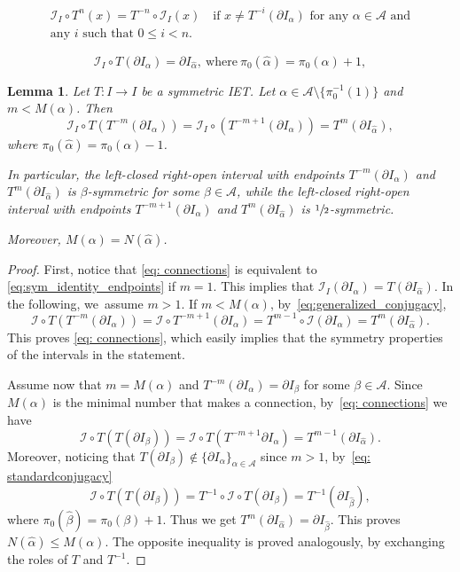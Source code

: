 \documentclass[10pt,a4paper]{article}
\theoremstyle{plain}
\newtheorem{lemma}[theorem]{Lemma}
\theoremstyle{definition}
\newcommand{\A}{\mathcal{A}}
\newcommand{\I}{\mathcal{I}}
\begin{document}
\begin{multline}
\label{eq:generalized_conjugacy}
\mathcal{I}_I\circ T^n(x)=T^{-n}\circ\mathcal{I}_I(x) \quad \text{if } x \neq T^{-i}(\partial I_\alpha) \text{ for any } \alpha \in \A \text{ and}\\ \text{any $i$ such that } 0 \leq i < n.
\end{multline}

\begin{equation}
\label{eq:sym_identity_endpoints}
\I_I\circ T(\partial I_{\alpha})=\partial I_{\hat\alpha},\ \text{where}\ \pi_0(\hat\alpha)=\pi_0(\alpha)+1,
\end{equation}

\begin{lemma}\label{lem: sym_endpoints}
{Let $T : I \to I$ be a symmetric IET.}
Let $\alpha\in\mathcal A\setminus\{\pi_0^{-1}(1)\}$ and $m< M(\alpha)$. Then
\begin{equation}\label{eq: connections}
\I_I\circ T(T^{-m}(\partial I_{\alpha}))={\I_I\circ (T^{-m+1}(\partial I_{\alpha}))}=T^m(\partial I_{\hat\alpha}),
\end{equation}
where $\pi_0(\hat\alpha)=\pi_0(\alpha)-1$.

In particular, the left-closed right-open interval with endpoints $T^{-m}(\partial I_{\alpha})$ and $T^m(\partial I_{\hat\alpha})$ is {$\beta$-symmetric for some $\beta\in\A$, while the left-closed right-open interval with endpoints $T^{-m+1}(\partial I_{\alpha})$ and $T^m(\partial I_{\hat\alpha})$ is $\sfrac{1}{2}$-symmetric}.

Moreover, $M(\alpha)= N(\hat\alpha)$.
\end{lemma}

\begin{proof}
First, notice that \eqref{eq: connections} is equivalent to \eqref{eq:sym_identity_endpoints} if $m = 1$. This implies that $\I_I(\partial I_\alpha) = T(\partial I_{\hat\alpha})$.
In the following, we~assume $m > 1$. If $m < M(\alpha)$, by~\eqref{eq:generalized_conjugacy},
\[
\I\circ T(T^{-m}(\partial I_{\alpha}))= \I \circ T^{-m + 1}(\partial I_\alpha) = T^{m - 1} \circ \I (\partial I_\alpha) = T^m(\partial I_{\hat \alpha}).
\]
This proves \eqref{eq: connections}, which easily implies that the symmetry properties of the intervals in the statement.

Assume now that $m=M(\alpha)$ and $T^{-m}(\partial I_{\alpha})=\partial I_{\beta}$ for some $\beta\in \A$. Since $M(\alpha)$ is the minimal number that makes a connection, by~\eqref{eq: connections} we have
\[
\I\circ T(T(\partial I_{\beta}))=\I\circ T(T^{-{m+1}}\partial I_{\alpha})=T^{m-1}(\partial I_{\hat\alpha}).
\]
Moreover, noticing that $T(\partial I_\beta) \notin \{\partial I_\alpha\}_{\alpha \in \A}$ since $m > 1$, by~\eqref{eq: standardconjugacy}
\[
\I\circ T(T(\partial I_{\beta}))=T^{-1}\circ\I\circ T(\partial I_{\beta})
=T^{-1}(\partial I_{\hat\beta}),
\]
where $\pi_0(\hat\beta)=\pi_0(\beta)+1$. Thus we get $T^{m}(\partial I_{\hat\alpha})=\partial I_{\hat\beta}$. This proves $N(\hat\alpha)\le M(\alpha)$. The opposite inequality is proved analogously, {by exchanging the roles of $T$ and $T^{-1}$.}
\end{proof}
\end{document}
